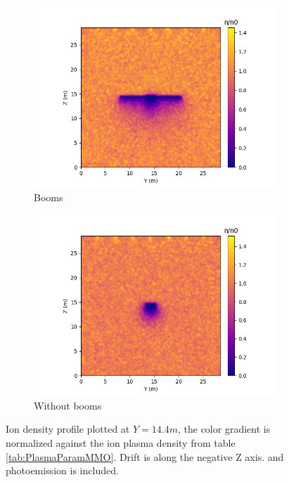 \begin{figure}[H]
  \begin{subfigure}[b]{0.6\textwidth}
  \includegraphics[width=\textwidth]{figures/MMO/minZ/WB/I_minZ_WB.png}
  \caption{Booms}
  \label{fig:I_minZ_WB}
\end{subfigure}
\begin{subfigure}[b]{0.6\textwidth}
  \includegraphics[width=\textwidth]{figures/MMO/minZ/NB/I_minZ_NB.png}
  \caption{Without booms}
  \label{fig:I_minZ_NB}
\end{subfigure}
\label{fig:Ion_minZ}
\caption{Ion density profile plotted at $Y = 14.4 m$, the color gradient is normalized against the ion plasma density from table \ref{tab:PlasmaParamMMO}. Drift is along the negative Z axis. and photoemission is included.}
\end{figure}

